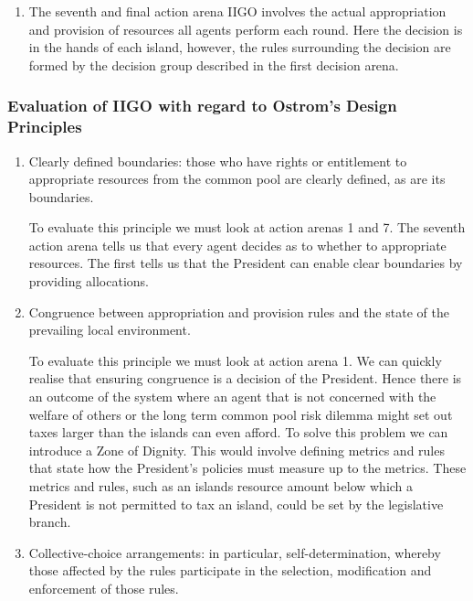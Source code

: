 \begin{itemize}
\begin{enumerate}
        \item The seventh and final action arena IIGO involves the actual appropriation and provision of resources all agents perform each round. Here the decision is in the hands of each island, however, the rules surrounding the decision are formed by the decision group described in the first decision arena. 
    \end{enumerate}
    
\end{itemize}
\subsubsection {Evaluation of IIGO with regard to Ostrom’s Design Principles} \label{sec:ostrom_eval}
\begin{enumerate}
    \item Clearly defined boundaries: those who have rights or entitlement to appropriate resources from the common pool are clearly defined, as are its boundaries.
    
    To evaluate this principle we must look at action arenas 1 and 7. The seventh action arena tells us that every agent decides as to whether to appropriate resources. The first tells us that the President can enable clear boundaries by providing allocations.
    
    \item Congruence between appropriation and provision rules and the state of the prevailing local environment.
    
    To evaluate this principle we must look at action arena 1. We can quickly realise that ensuring congruence is a decision of the President. Hence there is an outcome of the system where an agent that is not concerned with the welfare of others or the long term common pool risk dilemma might set out taxes larger than the islands can even afford. To solve this problem we can introduce a Zone of Dignity. This would involve defining metrics and rules that state how the President's policies must measure up to the metrics. These metrics and rules, such as an islands resource amount below which a President is not permitted to tax an island, could be set by the legislative branch.
    
    \item Collective-choice arrangements: in particular, self-determination, whereby those affected by the rules participate in the selection, modification and enforcement of those rules.
    

\end{enumerate}
